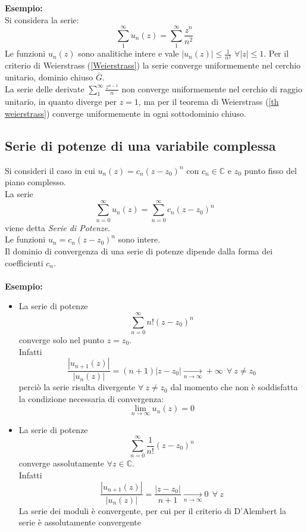 \documentclass[twoside]{article}
\begin{document}
\textbf{Esempio:}\\
Si considera la serie:
\begin{equation}
    \sum_1^\infty u_n(z)=\sum_1^\infty\frac{z^n}{n^2}
\end{equation}
Le funzioni $u_n(z)$ sono analitiche intere e vale $|u_n(z)|\le\frac{1}{n^2}$ $\forall |z|\le 1$. Per il criterio di Weierstrass (\ref{Weierstrass}) la serie converge uniformemente nel cerchio unitario, dominio chiuso $\bar{G}$.\\
La serie delle derivate $\sum_1^\infty\frac{z^{n-1}}{n}$ non converge uniformemente nel cerchio di raggio unitario, in quanto diverge per $z=1$, ma per il teorema di Weierstrass (\ref{th weierstrass}) converge uniformemente in ogni sottodominio chiuso.\\
\subsection{Serie di potenze di una variabile complessa}
Si consideri il caso in cui $u_n(z)=c_n (z-z_0)^n$ con $c_n \in \mathds{C}$ e $z_0$ punto fisso del piano complesso. \\
La serie
\begin{equation}
    \sum_{n=0} ^{\infty} u_n(z)=\sum_{n=0}^{\infty} c_n (z-z_0)^n
\end{equation}
viene detta \textit{Serie di Potenze}.
\\
Le funzioni $u_n=c_n(z-z_0)^n$ sono intere.
\\
Il dominio di convergenza di una serie di potenze dipende dalla forma dei coefficienti $c_n$.
\\ \\
\textbf{Esempio:}
\begin{itemize}
    \item La serie di potenze 
\begin{equation}
    \sum_{n=0}^{\infty} n!(z-z_0)^n
\end{equation}
converge solo nel punto $z=z_0$.
\\
Infatti
\begin{equation}
    \frac{|u_{n+1}(z)|}{|u_n(z)|}=(n+1)|z-z_0| \xrightarrow[n \rightarrow \infty] \ +\infty \ \ \forall \ z \ne z_0
\end{equation}
perciò la serie risulta divergente $\forall \ z \ne z_0$ dal momento che non è soddisfatta la condizione necessaria di convergenza:
\begin{equation}
    \lim_{n \to \infty}u_n(z)=0
\end{equation}
\item La serie di potenze 
\begin{equation}
    \sum_{n=0}^{\infty} \frac{1}{n!}(z-z_0)^n
\end{equation}
converge assolutamente $\forall z\in \mathds{C}$.\\
Infatti
\begin{equation}
    \frac{|u_{n+1}(z)|}{|u_n(z)|}=\frac{|z-z_0|}{n+1} \xrightarrow[n \rightarrow \infty] \ 0 \ \ \forall \ z
\end{equation}
La serie dei moduli è convergente, per cui per il criterio di D'Alembert la serie è assolutamente convergente
\end{itemize}
\end{document}
